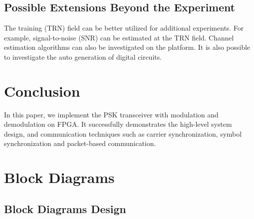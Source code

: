 \documentclass[journal,twoside]{IEEEtran}
\begin{document}
    \subsection{Possible Extensions Beyond the Experiment}

      The training (TRN) field can be better utilized for additional experiments.
      For example, signal-to-noise (SNR) can be estimated at the TRN field.
      Channel estimation algorithms \cite{zhao2023ompl,you2023beam} can also be investigated on the platform.
      It is also possible to investigate the auto generation \cite{zhao2023automatic} of digital circuits.

  \section{Conclusion}

    In this paper,
    we implement the PSK transceiver with modulation and demodulation on FPGA.
    It successfully demonstrates the high-level system design,
    and communication techniques such as carrier synchronization, symbol synchronization and packet-based communication.

  \appendices

  \section{Block Diagrams}\label{sec:block_diagrams}

    \subsection{Block Diagrams Design}
\end{document}
